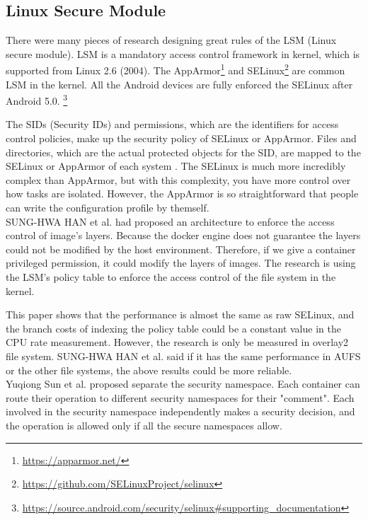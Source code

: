 \subsection{Linux Secure Module}
There were many pieces of research designing great rules of the LSM (Linux secure module). LSM is a
mandatory access control framework in kernel, which is supported from Linux 2.6 (2004). The
AppArmor\footnote{\url{https://apparmor.net/}} and SELinux\footnote{\url{https://github.com/SELinuxProject/selinux}}
are common LSM in the kernel. All the
Android devices are fully enforced the SELinux after Android 5.0.
\footnote{\url{https://source.android.com/security/selinux\#supporting\_documentation}}

The SIDs (Security IDs) and permissions, which are the identifiers for access control policies,
make up the security policy of SELinux or AppArmor. Files and directories, which are the actual protected
objects for the SID, are mapped to the SELinux or AppArmor of each system \cite{Smalley2003ImplementingSA,x11-SELinux,quteprints30563}.
The SELinux is much more incredibly complex than AppArmor, but with this complexity, you have more
control over how tasks are isolated. However, the AppArmor is so straightforward that people can
write the configuration profile by themself. \\

SUNG-HWA HAN et al.\cite{9184912} had proposed an architecture to enforce the access
control of image's layers. Because the docker engine does not guarantee the layers could
not be modified by the host environment. Therefore, if we give a container privileged
permission, it could modify the layers of images. The research \cite{9184912} is using
the LSM's policy table to enforce the access control of the file system in the kernel.

This paper \cite{9184912} shows that the performance is almost the same as raw SELinux,
and the branch costs of indexing the policy table could be a constant value in the
CPU rate measurement. However, the research is only be measured in overlay2 file system.
SUNG-HWA HAN et al. said if it has the same performance in AUFS or the other file systems,
the above results could be more reliable. \\

Yuqiong Sun et al.\cite{217614} proposed separate the security namespace. Each container
can route their operation to different security namespaces for their "comment". Each
involved in the security namespace independently makes a security decision, and the
operation is allowed only if all the secure namespaces allow.


